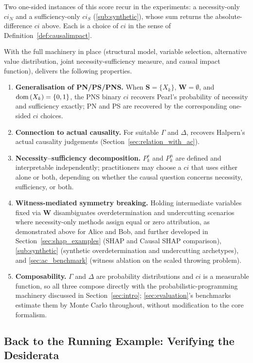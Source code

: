 \noindent Two one-sided instances of this score recur in the experiments: a
necessity-only $ci_N$ and a sufficiency-only $ci_S$ (\cref{sub:synthetic}), whose sum
returns the absolute-difference $ci$ above. Each is a choice of $ci$ in the sense of
Definition~\ref{def:causalimpact}.

With the full machinery in place (structural model, variable selection, alternative
value distribution, joint necessity-sufficiency measure, and causal impact function),
\ourapproach delivers the following properties.
\begin{enumerate}[label=(\roman*)]
\item \textbf{Generalisation of PN/PS/PNS.} When $\mathbf{S}=\{X_k\}$,
  $\mathbf{W}=\emptyset$, and $\operatorname{dom}\,(X_k)=\{0,1\}$, the PNS binary $ci$ recovers Pearl's
  probability of necessity and sufficiency exactly; PN and PS are recovered by the
  corresponding one-sided $ci$ choices.
\item \textbf{Connection to actual causality.} For suitable $\Gamma$
  and $\Delta$, \ourapproach recovers Halpern's actual causality judgements
  (Section~\ref{sec:relation_with_ac}).
\item \textbf{Necessity--sufficiency decomposition.} $P_k^s$ and $P_k^n$ are defined and
  interpretable independently; practitioners may choose a $ci$ that uses either alone
  or both, depending on whether the causal question concerns necessity, sufficiency,
  or both.
\item \textbf{Witness-mediated symmetry breaking.} Holding intermediate variables fixed
  via $\mathbf{W}$ disambiguates overdetermination and undercutting scenarios where
  necessity-only methods assign equal or zero attribution, as demonstrated above for
  Alice and Bob, and further developed in Section~\ref{sec:shap_examples} (SHAP and
  Causal SHAP comparison), \cref{sub:synthetic} (synthetic overdetermination
  and undercutting archetypes), and \cref{sec:ac_benchmark} (witness ablation
  on the scaled throwing problem).
\item \textbf{Composability.} $\Gamma$ and $\Delta$ are probability distributions and
  $ci$ is a measurable function, so all three compose directly with the
  probabilistic-programming machinery discussed in Section~\ref{sec:intro};
  \cref{sec:evaluation}'s benchmarks estimate them by Monte Carlo throughout, without
  modification to the core formalism.
\end{enumerate}

\subsection{Back to the Running Example: Verifying the Desiderata}
\label{sub:verify_desiderata}

